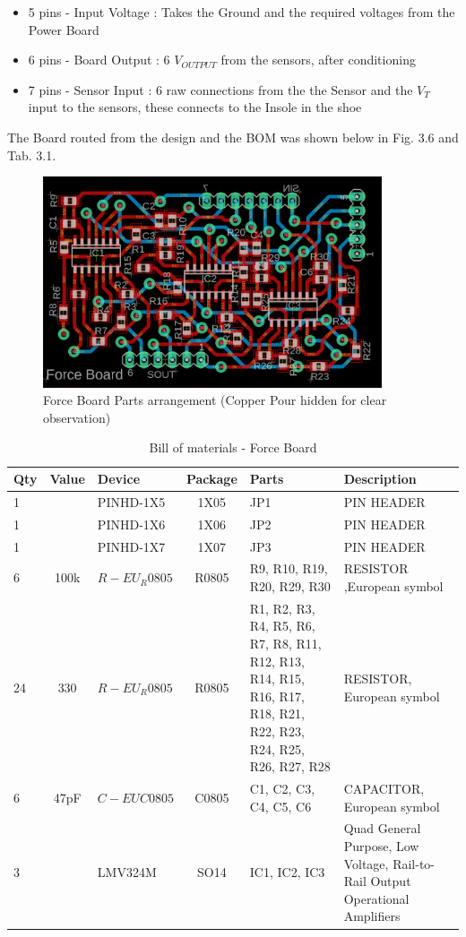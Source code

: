 \documentclass[12 pt, a4paper]{thesis}
\begin{document}
\begin{itemize}
\item{5 pins - Input Voltage : Takes the Ground and the required voltages from the Power Board}
\item{6 pins - Board Output : 6 $V_{OUTPUT}$ from the sensors, after conditioning}
\item{7 pins - Sensor Input : 6 raw connections from the the Sensor and the $V_T$ input to the sensors, these connects to the Insole in the shoe }
\end{itemize}  
The Board routed from the design and the BOM was shown below in Fig. 3.6 and Tab. 3.1.
\begin{figure}[hbt!]
\begin{center}
\includegraphics[width = 10cm]{ForceBrd.png}
\caption{Force Board Parts arrangement (Copper Pour hidden for clear observation)}
\end{center}
\end{figure}
\begin{table}[hbt!]
\begin{center}
\begin{tabular}{| m{0.7cm} | c | m{2.5cm} | c | m{4cm} | m{4cm} |}
\hline
Qty & Value & Device & Package & Parts & Description\\
\hline
1 & & PINHD-1X5 & 1X05 & JP1 & PIN HEADER\\
\hline
1 & & PINHD-1X6 & 1X06 & JP2 & PIN HEADER\\
\hline
1 & & PINHD-1X7 & 1X07 & JP3 & PIN HEADER\\
\hline
6 & 100k & $R-EU_R0805$ & R0805 & R9, R10, R19, R20, R29, R30 & RESISTOR ,European symbol\\
\hline
24 & 330 & $R-EU_R0805$ & R0805 & R1, R2, R3, R4, R5, R6, R7, R8, R11, R12, R13, R14, R15, R16, R17, R18, R21, R22, R23, R24, R25, R26, R27, R28
& RESISTOR, European symbol\\
\hline
6 & 47pF & $C-EUC0805$ & C0805 & C1, C2, C3, C4, C5, C6 & CAPACITOR, European symbol\\
\hline
3 & & LMV324M & SO14 & IC1, IC2, IC3 & Quad General Purpose, Low Voltage, Rail-to-Rail Output Operational Amplifiers\\
\hline
\end{tabular}
\end{center}
\caption{Bill of materials - Force Board}
\end{table}
\end{document}
